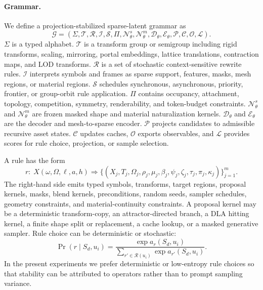 \paragraph{Grammar.}
We define a projection-stabilized sparse-latent grammar as
\begin{equation}
\mathcal{G}=
(\Sigma,\mathcal{T},\mathcal{R},\mathcal{I},\mathcal{S},\Pi,
\mathcal{N}_{\theta}^{s},\mathcal{N}_{\theta}^{m},
\mathcal{D}_{\theta},\mathcal{E}_{\theta},
\mathcal{P},\mathcal{C},\mathcal{O},\mathcal{L}).
\end{equation}
\(\Sigma\) is a typed alphabet. \(\mathcal{T}\) is a transform group or semigroup including rigid transforms, scaling, mirroring, portal embeddings, lattice translations, contraction maps, and LOD transforms. \(\mathcal{R}\) is a set of stochastic context-sensitive rewrite rules. \(\mathcal{I}\) interprets symbols and frames as sparse support, features, masks, mesh regions, or material regions. \(\mathcal{S}\) schedules synchronous, asynchronous, priority, frontier, or group-orbit rule application. \(\Pi\) contains occupancy, attachment, topology, competition, symmetry, renderability, and token-budget constraints. \(\mathcal{N}_{\theta}^{s}\) and \(\mathcal{N}_{\theta}^{m}\) are frozen masked shape and material naturalization kernels. \(\mathcal{D}_{\theta}\) and \(\mathcal{E}_{\theta}\) are the decoder and mesh-to-sparse encoder. \(\mathcal{P}\) projects candidates to admissible recursive asset states. \(\mathcal{C}\) updates caches, \(\mathcal{O}\) exports observables, and \(\mathcal{L}\) provides scores for rule choice, projection, or sample selection.

A rule has the form
\begin{equation}
r:\;X(\omega,\Omega,\ell,a,h)
\Rightarrow
\{(X_j,T_j,\Omega_j,\rho_j,\mu_j,\beta_j,\psi_j,\zeta_j,\tau_j,\pi_j,\kappa_j)\}_{j=1}^{m}.
\end{equation}
The right-hand side emits typed symbols, transforms, target regions, proposal kernels, masks, blend kernels, preconditions, random seeds, sampler schedules, geometry constraints, and material-continuity constraints. A proposal kernel may be a deterministic transform-copy, an attractor-directed branch, a DLA hitting kernel, a finite shape split or replacement, a cache lookup, or a masked generative sampler. Rule choice can be deterministic or stochastic:
\begin{equation}
\Pr(r\mid S_d,u_i)=
\frac{\exp a_r(S_d,u_i)}
{\sum_{r'\in\mathcal{R}(u_i)}\exp a_{r'}(S_d,u_i)}.
\end{equation}
In the present experiments we prefer deterministic or low-entropy rule choices so that stability can be attributed to operators rather than to prompt sampling variance.

